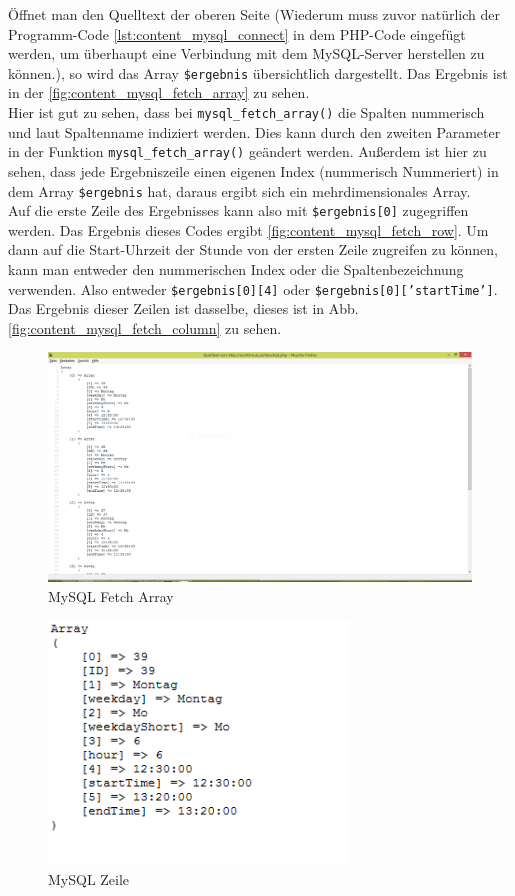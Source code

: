 Öffnet man den Quelltext der oberen Seite (Wiederum muss zuvor natürlich der Programm-Code \ref{lst:content_mysql_connect} in dem PHP-Code eingefügt werden, um überhaupt eine Verbindung mit dem MySQL-Server herstellen zu können.), so wird das Array \texttt{\$ergebnis} übersichtlich dargestellt. Das Ergebnis ist in der \autoref{fig:content_mysql_fetch_array} zu sehen.\\
Hier ist gut zu sehen, dass bei \texttt{mysql\_fetch\_array()} die Spalten nummerisch und laut Spaltenname indiziert werden. Dies kann durch den zweiten Parameter in der Funktion \texttt{mysql\_fetch\_array()} geändert werden. Außerdem ist hier zu sehen, dass jede Ergebniszeile einen eigenen Index (nummerisch Nummeriert) in dem Array \texttt{\$ergebnis} hat, daraus ergibt sich ein mehrdimensionales Array.\\
Auf die erste Zeile des Ergebnisses kann also mit \texttt{\$ergebnis[0]} zugegriffen werden. Das Ergebnis dieses Codes ergibt \autoref{fig:content_mysql_fetch_row}. Um dann auf die Start-Uhrzeit der Stunde von der ersten Zeile zugreifen zu können, kann man entweder den nummerischen Index oder die Spaltenbezeichnung verwenden. Also entweder \texttt{\$ergebnis[0][4]} oder \texttt{\$ergebnis[0]['startTime']}.\\ Das Ergebnis dieser Zeilen ist dasselbe, dieses ist in Abb. \ref{fig:content_mysql_fetch_column} zu sehen.\\
\begin{figure}[H]
\centering
\includegraphics[keepaspectratio=true, width=14cm]{images/screenshots/content_mysql_fetch_array.png}
\caption{MySQL Fetch Array}
\label{fig:content_mysql_fetch_array}
\end{figure}
\begin{figure}[H]
\centering
\includegraphics[keepaspectratio=true, width=8cm]{images/screenshots/content_mysql_fetch_row.png}
\caption{MySQL Zeile}
\label{fig:content_mysql_fetch_row}
\end{figure}
